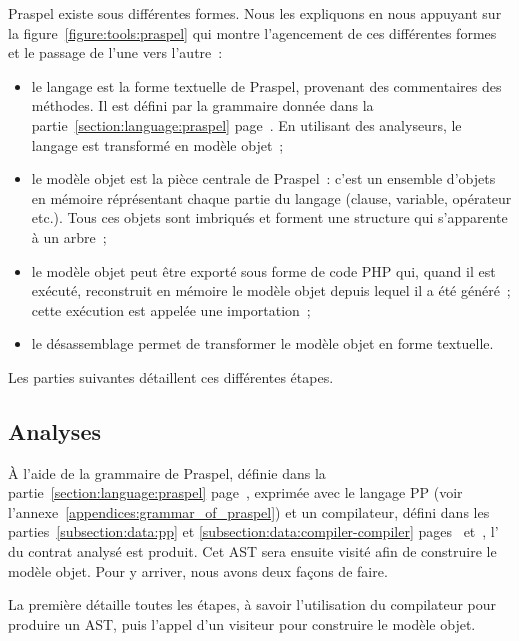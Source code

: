 Praspel existe sous différentes formes. Nous les expliquons en nous appuyant sur
la figure~\ref{figure:tools:praspel} qui montre l'agencement de ces différentes
formes et le passage de l'une vers l'autre~:
%
\begin{itemize}

\item le langage est la forme textuelle de Praspel, provenant des commentaires
des méthodes. Il est défini par la grammaire donnée dans la
partie~\ref{section:language:praspel} page~\pageref{section:language:praspel}.
En utilisant des analyseurs, le langage est transformé en modèle objet~;

\item le modèle objet  est la pièce centrale de Praspel~: c'est un
ensemble d'objets en mémoire réprésentant chaque partie du langage (clause,
variable, opérateur etc.). Tous ces objets sont imbriqués et forment une
structure qui s'apparente à un arbre~;

\item le modèle objet peut être exporté sous forme de code PHP qui, quand il est
exécuté, reconstruit en mémoire le modèle objet depuis lequel il a été généré~;
cette exécution est appelée une importation~;

\item le désassemblage permet de transformer le modèle objet en forme textuelle.

\end{itemize}
%
Les parties suivantes détaillent ces différentes étapes.

\subsection{Analyses}
\label{subsection:tools:interpretation}

À l'aide de la grammaire de Praspel, définie dans la
partie~\ref{section:language:praspel} page~\pageref{section:language:praspel},
exprimée avec le langage PP (voir l'annexe~\ref{appendices:grammar_of_praspel})
et un compilateur, défini dans les parties~\ref{subsection:data:pp} et
\ref{subsection:data:compiler-compiler} pages~\pageref{subsection:data:pp}
et~\pageref{subsection:data:compiler-compiler}, l' du contrat analysé est produit. Cet AST sera ensuite visité afin de
construire le modèle objet. Pour y arriver, nous avons deux façons de faire.

La première détaille toutes les étapes, à savoir l'utilisation du compilateur
pour produire un AST, puis l'appel d'un visiteur pour construire le modèle
objet.

